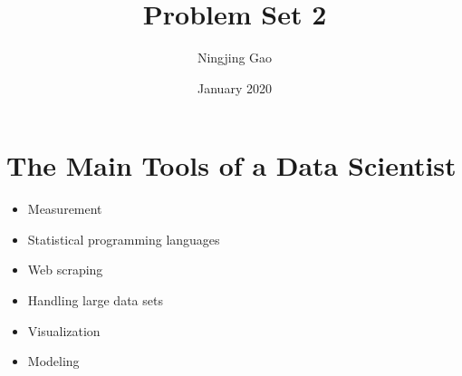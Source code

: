\documentclass{article}
\title{Problem Set 2}
\author{Ningjing Gao}
\date{January 2020}
\begin{document}
\maketitle


\section{The Main Tools of a Data Scientist}
\begin{itemize}
    \item Measurement
    \item Statistical programming languages
    \item Web scraping
    \item Handling large data sets
    \item Visualization
    \item Modeling
\end{itemize}
\end{document}
